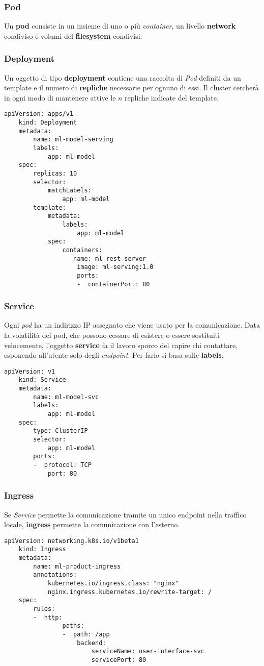 \subsubsection{Pod}
Un \textbf{pod} consiste in un insieme di uno o più \textit{container}, un livello \textbf{network} condiviso e volumi del \textbf{filesystem} condivisi.
\subsubsection{Deployment}
Un oggetto di tipo \textbf{deployment} contiene una raccolta di \textit{Pod} definiti da un template e il numero di \textbf{repliche} necessarie per ognuno di essi. Il cluster cercherà in ogni modo di mantenere attive le $n$ repliche indicate del template.
\begin{lstlisting}[style=yaml]
	apiVersion: apps/v1
	kind: Deployment
	metadata:
		name: ml-model-serving
		labels:
			app: ml-model
	spec:
		replicas: 10
		selector:
			matchLabels:
				app: ml-model
		template:
			metadata:
				labels:
					app: ml-model
			spec:
				containers:
				-  name: ml-rest-server
					image: ml-serving:1.0
					ports:
					-  containerPort: 80
\end{lstlisting}
\newpage
\subsubsection{Service}
Ogni \textit{pod} ha un indirizzo IP assegnato che viene usato per la comunicazione. Data la volatilità dei pod, che possono cessare di esistere o essere sostituiti velocemente, l'oggetto \textbf{service} fa il lavoro sporco del capire chi contattare, esponendo all'utente solo degli \textit{endpoint}. Per farlo si basa sulle \textbf{labels}.
\begin{lstlisting}[style=yaml]
	apiVersion: v1
	kind: Service
	metadata:
		name: ml-model-svc
		labels:
			app: ml-model
	spec:
		type: ClusterIP
		selector:
			app: ml-model
		ports:
		-  protocol: TCP
			port: 80
\end{lstlisting}

\subsubsection{Ingress}
Se \textit{Service} permette la comunicazione tramite un unico endpoint nella traffico locale, \textbf{ingress} permette la comunicazione con l'esterno.
\begin{lstlisting}[style=yaml]
	apiVersion: networking.k8s.io/v1beta1
	kind: Ingress
	metadata:
		name: ml-product-ingress
		annotations:
			kubernetes.io/ingress.class: "nginx"
			nginx.ingress.kubernetes.io/rewrite-target: /
	spec:
		rules:
		-  http:
				paths:
				-  path: /app
					backend:
						serviceName: user-interface-svc
						servicePort: 80
\end{lstlisting}
\newpage
